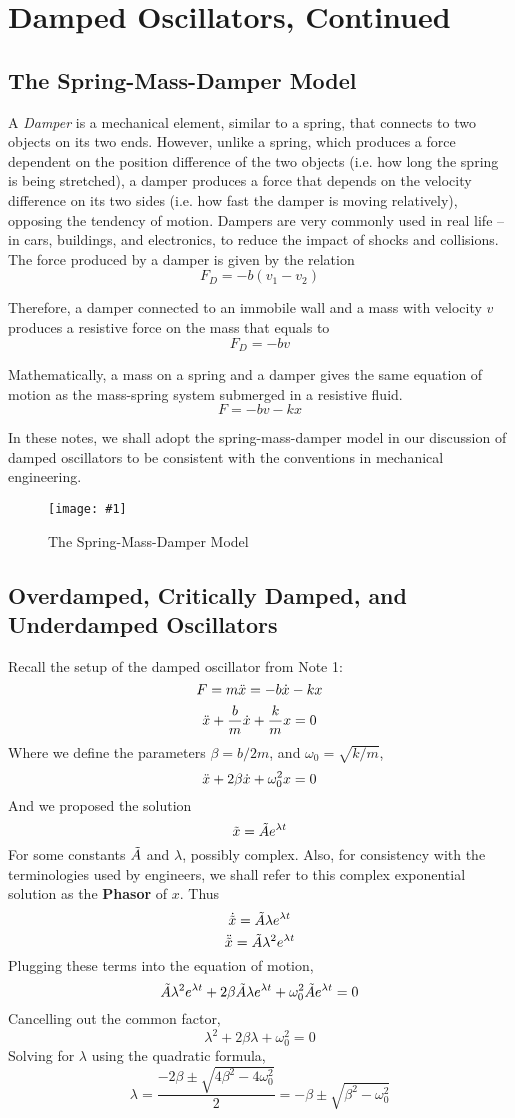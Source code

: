\documentclass[11pt]{article}
\newcommand{\fig}[4]{
    \begin{figure}[H]
        \centering
        \texttt{[image: \#1]}
        \caption{#2}
        \label{exp4fit}
    \end{figure}
}
\theoremstyle{gangnamstyle}{\newtheorem{definition}{Definition}[]}
\theoremstyle{gangnamstyle}{\newtheorem{example}{Example}[]}
\theoremstyle{gangnamstyle}{\newtheorem{problem}{Problem}[]}
\theoremstyle{gangnamstyle}{\newtheorem{warning}{Warning}[]}
\begin{document}

\section{Damped Oscillators, Continued}
\subsection{The Spring-Mass-Damper Model}

A \textit{Damper} is a mechanical element, similar to a spring, that connects to two objects on its two ends. However, unlike a spring, which produces a force dependent on the position difference of the two objects (i.e. how long the spring is being stretched), a damper produces a force that depends on the velocity difference on its two sides (i.e. how fast the damper is moving relatively), opposing the tendency of motion. Dampers are very commonly used in real life -- in cars, buildings, and electronics, to reduce the impact of shocks and collisions. \\
The force produced by a damper is given by the relation
\[ F_D = -b(v_1 - v_2) \]

Therefore, a damper connected to an immobile wall and a mass with velocity $v$ produces a resistive force on the mass that equals to
\[ F_D = -bv \]

Mathematically, a mass on a spring and a damper gives the same equation of motion as the mass-spring system submerged in a resistive fluid. 
\[ F = -bv - kx \]

In these notes, we shall adopt the spring-mass-damper model in our discussion of damped oscillators to be consistent with the conventions in mechanical engineering. 
\fig{figs/n2/damper.png}{The Spring-Mass-Damper Model}{1.25}{0}

\subsection{Overdamped, Critically Damped, and Underdamped Oscillators}

Recall the setup of the damped oscillator from Note 1: 
\[ F = m\Ddot{x} = -b\Dot{x} - kx \]
\[ \Ddot{x} + \frac{b}{m}\Dot{x} + \frac{k}{m}x = 0 \]
Where we define the parameters $\beta = b/2m$, and $\omega_0 = \sqrt{k / m}$, 
\[ \Ddot{x} + 2\beta\Dot{x} + \omega_0^2x = 0 \]
And we proposed the solution 
\[ \Tilde{x} = \Tilde{A}e^{\lambda t} \]
For some constants $\Tilde{A}$ and $\lambda$, possibly complex. Also, for consistency with the terminologies used by engineers, we shall refer to this complex exponential solution as the \textbf{Phasor} of $x$. Thus
\[ \Dot{\Tilde{x}} = \Tilde{A}\lambda e^{\lambda t} \]
\[ \Ddot{\Tilde{x}} = \Tilde{A}\lambda^2 e^{\lambda t} \]
Plugging these terms into the equation of motion, 
\[ \Tilde{A}\lambda^2 e^{\lambda t} + 2\beta \Tilde{A}\lambda e^{\lambda t} + \omega_0^2 \Tilde{A}e^{\lambda t} = 0 \]
Cancelling out the common factor, 
\[ \lambda^2 + 2\beta\lambda + \omega_0^2 = 0 \]
Solving for $\lambda$ using the quadratic formula,
\[ \lambda = \frac{-2\beta \pm \sqrt{4\beta^2 - 4\omega_0^2}}{2} = -\beta \pm \sqrt{\beta^2 - \omega_0^2} \]
\end{document}
